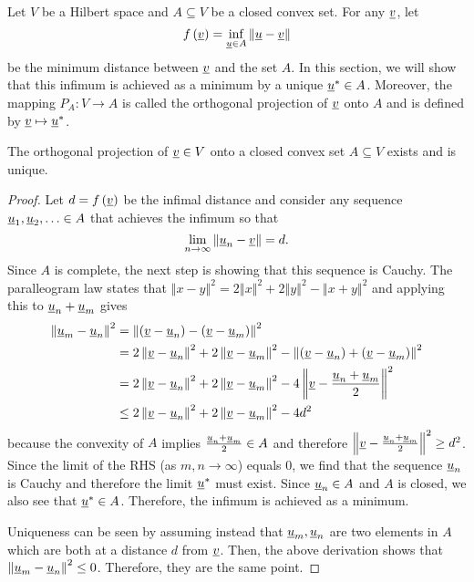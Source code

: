 Let $V$ be a Hilbert space and $A\subseteq V$ be a closed convex set. For any $\underline v$, let
\[
f\left(\underline v\right)=\inf_{\underline u\in A}\left\Vert \underline u-\underline v\right\Vert 
\]
be the minimum distance between $\underline v$ and the set $A$. In this section, we will show that this infimum is achieved as a minimum by a unique $\underline u^{*}\in A$. Moreover, the mapping $P_{A}:V\rightarrow A$ is called the orthogonal projection of $\underline v$ onto $A$ and is defined by $\underline v\mapsto\underline u^{*}$.
\begin{theorem}
\label{thm:HilbertProjectionTheorem} The orthogonal projection of $\underline v\in V$ onto a closed convex set $A\subseteq V$ exists and is unique.
\end{theorem}
\begin{proof}
Let $d=f\left(\underline v\right)$ be the infimal distance and consider any sequence $\underline u_{1},\underline u_{2},\ldots\in A$ that achieves the infimum so that
\[
\lim_{n\rightarrow\infty}\left\Vert \underline u_{n}-\underline v\right\Vert =d.
\]
Since $A$ is complete, the next step is showing that this sequence is Cauchy. The paralleogram law states that $\left\Vert x-y\right\Vert ^{2}=2\left\Vert x\right\Vert ^{2}+2\left\Vert y\right\Vert ^{2}-\left\Vert x+y\right\Vert ^{2}$ and applying this to $\underline u_{n}+\underline u_{m}$ gives
\begin{align*}
\left\Vert \underline u_{m}-\underline u_{n}\right\Vert ^{2} & =\left\Vert \left(\underline v-\underline u_{n}\right)-\left(\underline v-\underline u_{m}\right)\right\Vert ^{2}\\
 & =2\left\Vert \underline v-\underline u_{n}\right\Vert ^{2}+2\left\Vert \underline v-\underline u_{m}\right\Vert ^{2}-\left\Vert \left(\underline v-\underline u_{n}\right)+\left(\underline v-\underline u_{m}\right)\right\Vert ^{2}\\
 & =2\left\Vert \underline v-\underline u_{n}\right\Vert ^{2}+2\left\Vert \underline v-\underline u_{m}\right\Vert ^{2}-4\left\Vert \underline v-\frac{\underline u_{n}+\underline u_{m}}{2}\right\Vert ^{2}\\
 & \leq2\left\Vert \underline v-\underline u_{n}\right\Vert ^{2}+2\left\Vert \underline v-\underline u_{m}\right\Vert ^{2}-4d^{2}
\end{align*}
because the convexity of $A$ implies $\frac{\underline u_{n}+\underline u_{m}}{2}\in A$ and therefore $\left\Vert \underline v-\frac{\underline u_{n}+\underline u_{m}}{2}\right\Vert ^{2}\geq d^{2}$. Since the limit of the RHS (as $m,n\rightarrow\infty$) equals $0$, we find that the sequence $\underline u_{n}$ is Cauchy and therefore the limit $\underline u^{*}$ must exist. Since $\underline u_{n}\in A$ and $A$ is closed, we also see that $\underline u^{*}\in A$. Therefore, the infimum is achieved as a minimum.

Uniqueness can be seen by assuming instead that $\underline u_{m},\underline u_{n}$ are two elements in $A$ which are both at a distance $d$ from $\underline v$. Then, the above derivation shows that $\left\Vert \underline u_{m}-\underline u_{n}\right\Vert ^{2}\leq0$. Therefore, they are the same point.
\end{proof}
